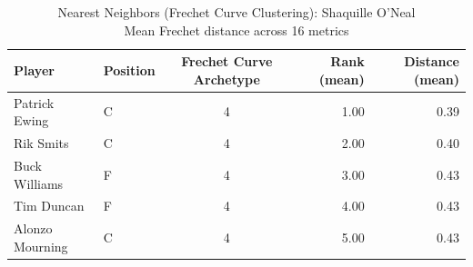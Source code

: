 \begin{table}[t]
\caption*{
{\fontsize{20}{25} Nearest Neighbors (Frechet Curve Clustering): Shaquille O'Neal\fontsize{12}{15}\selectfont } \\ 
{\fontsize{14}{17}\selectfont  Mean Frechet distance across 16 metrics\fontsize{12}{15}\selectfont }
} 
\fontsize{12.0pt}{14.0pt}\selectfont
\begin{tabular*}{\linewidth}{@{\extracolsep{\fill}}llcrr}
\toprule
Player & Position & Frechet Curve Archetype & Rank (mean) & Distance (mean) \\ 
\midrule\addlinespace[2.5pt]
Patrick Ewing & C & 4 & 1.00 & 0.39 \\ 
Rik Smits & C & 4 & 2.00 & 0.40 \\ 
Buck Williams & F & 4 & 3.00 & 0.43 \\ 
Tim Duncan & F & 4 & 4.00 & 0.43 \\ 
Alonzo Mourning & C & 4 & 5.00 & 0.43 \\ 
\bottomrule
\end{tabular*}
\end{table}

